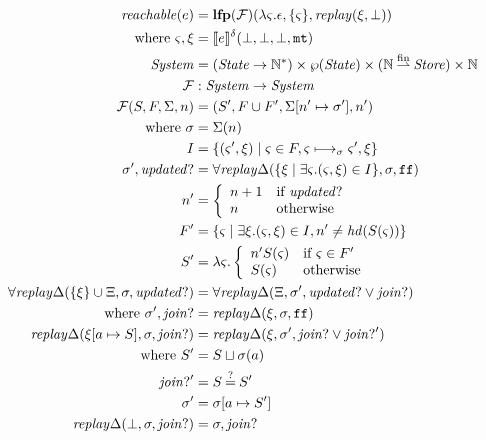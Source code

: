 \documentclass{llncs}
\newcommand{\finto}{\mathbin{\overset{\text{fin}}{\rightharpoonup}}}
\newcommand{\setof}[1]{\{ #1 \}}
\begin{document}
\begin{align*}
\mathit{reachable}(e) &= \lfp{{\mathcal F}}(\lambda\mstate. \epsilon, \setof{\mstate}, \replay(\msdiff,\bot)) \\
 \text{ where } \mstate, \msdiff &= \compile{e}^\mcntr(\bot,\bot,\bot,\kmt) \\
\System &= (\State \to {\mathbb N}^*) \times \wp(\State) \times ({\mathbb N} \finto \Store) \times {\mathbb N} \\
{\mathcal F} &: \System \to \System \\
{\mathcal F}(S,F,\Sigma,n) &= (S', F \cup F', \Sigma[n' \mapsto \msto'],n') \\
 \text{ where }
 \msto &= \Sigma(n) \\
  I &= \setof{ \ttuple{\mstate'}{\msdiff} \mid \mstate \in F, \mstate \machstep_\msto \mstate', \msdiff} \\
  \msto',\updatedp &=
     \replaychangeall(\setof{\msdiff \mid \exists \mstate. (\mstate, \msdiff) \in I}, \msto,\sfalse) \\
  n' &= \left\{\begin{array}{ll}
                n + 1 & \text{if } \updatedp \\
                n & \text{otherwise}
               \end{array}\right. \\
  F' &= \setof{\mstate \mid \exists \msdiff. (\mstate,\msdiff) \in I,
                n' \neq \hd(S(\mstate))} \\
  S' &= \lambda \mstate. \left\{\begin{array}{ll}
                                 n' S(\mstate) & \text{if } \mstate \in F' \\
                                 S(\mstate) & \text{otherwise}
                                \end{array}\right. \\
  \replaychangeall(\setof{\msdiff} \cup \Xi, \msto, \updatedp) &=
    \replaychangeall(\Xi, \msto', \updatedp \vee \joinp) \\
   \text{ where } \msto', \joinp &= \replaychange(\msdiff, \msto, \sfalse) \\
  \replaychange(\msdiff[\maddr \mapsto S], \msto, \joinp) &=
   \replaychange(\msdiff, \msto', \joinp \vee \joinp') \\
  \text{ where } S' &= S \sqcup \msto(\maddr) \\
                 \joinp' &= S \deceq S' \\
                 \msto' &= \msto[\maddr \mapsto S'] \\
  \replaychange(\bot, \msto, \joinp) &= \msto, \joinp
\end{align*}
\end{document}
